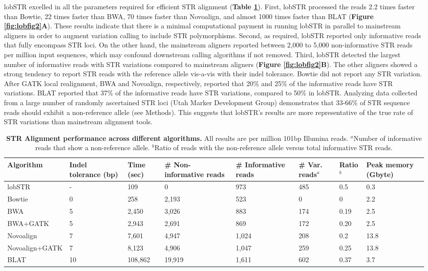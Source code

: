 lobSTR excelled in all the parameters required for efficient STR alignment (\textbf{Table \ref{tab:lobtab1}}). First, lobSTR processed the reads 2.2 times faster than Bowtie, 22 times faster than BWA, 70 times faster than Novoalign, and almost 1000 times faster than BLAT (\textbf{Figure \ref{fig:lobfig2}A}). These results indicate that there is a minimal computational payment in running lobSTR in parallel to mainstream aligners in order to augment variation calling to include STR polymorphisms. Second, as required, lobSTR reported only informative reads that fully encompass STR loci. On the other hand, the mainstream aligners reported between 2,000 to 5,000 non-informative STR reads per million input sequences, which may confound downstream calling algorithms if not removed. Third, lobSTR detected the largest number of informative reads with STR variations compared to mainstream aligners (\textbf{Figure \ref{fig:lobfig2}B}). The other aligners showed a strong tendency to report STR reads with the reference allele vis-a-vis with their indel tolerance. Bowtie did not report any STR variation. After GATK local realignment, BWA and Novoalign, respectively, reported that 20\% and 25\% of the informative reads have STR variations. BLAT reported that 37\% of the informative reads have STR variations, compared to 50\% in lobSTR. Analyzing data collected from a large number of randomly ascertained STR loci \cite{PayseurJingHaasl2011} (Utah Marker Development Group) demonstrates that 33-66\% of STR sequence reads should exhibit a non-reference allele (see Methods). This suggests that lobSTR's results are more representative of the true rate of STR variations than mainstream alignment tools.

\begin{table}
\centering
\label{tab:lobtab1}
\begin{adjustbox}{width=1\textwidth}
\begin{tabular}{l l l l l l l l}
\hline
Algorithm & Indel tolerance (bp) & Time (sec)& \# Non-informative reads & \# Informative reads & \# Var. reads$^a$	& Ratio$^b$ & Peak memory (Gbyte) \\
\hline
lobSTR & - & 109 & 0 & 973 & 485 & 0.5 & 0.3\\
Bowtie&0&258&2,193&523&0&0&2.2\\
BWA&5&2,450&3,026&883&174&0.19&2.5\\
BWA+GATK&5&2,943&2,691&869&172&0.20&2.5\\
Novoalign&7&7,601&4,947&1,024&208&0.2&13.8\\
Novoalign+GATK&7&8,123&4,906&1,047&259&0.25&13.8\\
BLAT&10&108,862&19,919&1,611&602&0.37&3.7\\
\hline
\end{tabular}
\end{adjustbox}
\caption{\textbf{STR Alignment performance across different algorithms.} All results are per million 101bp Illumina reads. $^a$Number of informative reads that show a non-reference allele. $^b$Ratio of reads with the non-reference allele versus total informative STR reads.}
\end{table}

